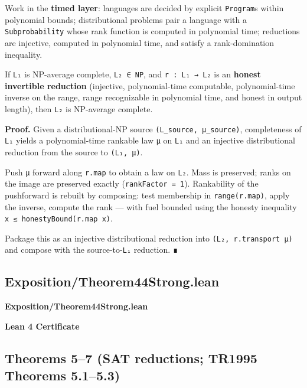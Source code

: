 \documentclass[11pt,a4paper]{article}
\begin{document}
Work in the \textbf{timed layer}: languages are decided by explicit \texttt{Program}s within polynomial bounds; distributional problems pair a language with a \texttt{Subprobability} whose rank function is computed in polynomial time; reductions are injective, computed in polynomial time, and satisfy a rank-domination inequality.

If \texttt{L₁} is NP-average complete, \texttt{L₂\ ∈\ NP}, and \texttt{r\ :\ L₁\ →\ L₂} is an \textbf{honest invertible reduction} (injective, polynomial-time computable, polynomial-time inverse on the range, range recognizable in polynomial time, and honest in output length), then \texttt{L₂} is NP-average complete.

\textbf{Proof.} Given a distributional-NP source \texttt{(L\_source,\ μ\_source)}, completeness of \texttt{L₁} yields a polynomial-time rankable law \texttt{μ} on \texttt{L₁} and an injective distributional reduction from the source to \texttt{(L₁,\ μ)}.

Push \texttt{μ} forward along \texttt{r.map} to obtain a law on \texttt{L₂}. Mass is preserved; ranks on the image are preserved exactly (\texttt{rankFactor\ =\ 1}). Rankability of the pushforward is rebuilt by composing: test membership in \texttt{range(r.map)}, apply the inverse, compute the rank --- with fuel bounded using the honesty inequality \texttt{\textbar{}x\textbar{}\ ≤\ honestyBound(\textbar{}r.map\ x\textbar{})}.

Package this as an injective distributional reduction into \texttt{(L₂,\ r.transport\ μ)} and compose with the source-to-\texttt{L₁} reduction. ∎

\hypertarget{exposition-theorem44strong-lean}{%
\subsection{Exposition/Theorem44Strong.lean}\label{exposition-theorem44strong-lean}}

\noindent\textbf{Exposition/Theorem44Strong.lean}

\vspace{0.75\baselineskip}
\noindent\textcolor{green!40!black}{\textbf{Lean 4 Certificate}}\par\vspace{0.25\baselineskip}

\vspace{0.75\baselineskip}

\hypertarget{theorems-57-sat-reductions-tr1995-theorems-5.15.3}{%
\subsection{Theorems 5--7 (SAT reductions; TR1995 Theorems 5.1--5.3)}\label{theorems-57-sat-reductions-tr1995-theorems-5.15.3}}
\end{document}
